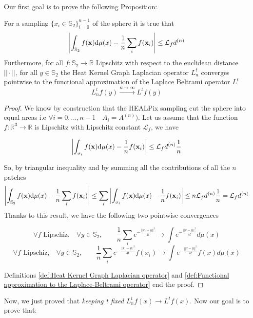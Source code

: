 Our first goal is to prove the following Proposition: 
\vspace{0.5cm}
\begin{prop}\label{prop:1}
	For a sampling $\{x_i\in\mathbb S_2\}_{i=0}^{n-1}$ of the sphere it is true that
	$$
	\left| \int_{\mathbb S_2}f({\bf x})\text{d}{\mu(x)} - \frac{1}{n}\sum_i f(\mathbf x_i)\right|\leq \mathcal L_fd^{(n)}
	$$
	Furthermore, for all $f: \mathbb S_2 \rightarrow \mathbb R$ Lipschitz with respect to the euclidean distance $||\cdot||$, for all $y\in\mathbb S_2$ the Heat Kernel Graph Laplacian operator $L^t_n$ converges pointwise to the functional approximation of the Laplace Beltrami operator $L^t$
	$$ L_n^tf(y)\xrightarrow{n\to\infty} L^tf(y)$$
\end{prop} 
\vspace{0.5cm}


\begin{proof}
	We know by construction that the HEALPix sampling cut the sphere into equal areas i.e $\forall i=0, ..., n-1\quad A_i = A^{(n)}) $.
	Let us assume that the function $f:\mathbb R^3\rightarrow \mathbb R$ is Lipschitz with Lipschitz constant $\mathcal L_f$, we have 
	
	$$\left| \int_{\sigma_{i}}f({\bf x})\text{d}{\mu(x)} - \frac{1}{n}f(\mathbf x_i)\right| \leq \mathcal L_fd^{(n)}\frac{1}{n} $$

	So, by triangular inequality and by summing all the contributions of all the $n$ patches
	$$\left| \int_{\mathbb S_2}f({\bf x})\text{d}{\mu(x)} - \frac{1}{n}\sum_i f(\mathbf x_i)\right| \leq \sum_i \left| \int_{\sigma_{i}}f({\bf x})\text{d}{\mu(x)} - \frac{1}{n}f(\mathbf x_i)\right|\leq n  \mathcal L_fd^{(n)}\frac{1}{n} = \mathcal L_fd^{(n)}$$	
	Thanks to this result, we have the following two pointwise convergences
	
	$$\forall f \text{ Lipschiz,}\quad \forall y\in\mathbb S_2,  \quad\quad \frac{1}{n}\sum_i e^{-\frac{||x_i-y||^2}{4t}}\rightarrow \int e^{-\frac{||x-y||^2}{4t}}d\mu(x)$$
	$$\forall f \text{ Lipschiz,}\quad \forall y\in\mathbb S_2,  \quad\quad \frac{1}{n}\sum_i e^{-\frac{||x_i-y||^2}{4t}}f(x_i)\rightarrow \int e^{-\frac{||x-y||^2}{4t}}f(x)d\mu(x)$$
	
	Definitions \ref{def:Heat Kernel Graph Laplacian operator} and \ref{def:Functional approximation to the Laplace-Beltrami operator} end the proof.
\end{proof}
\vspace{0.5cm}

Now, we just proved that \textit{keeping t fixed} $L_n^tf(x)\rightarrow L^tf(x)$. Now our goal is to prove that:

